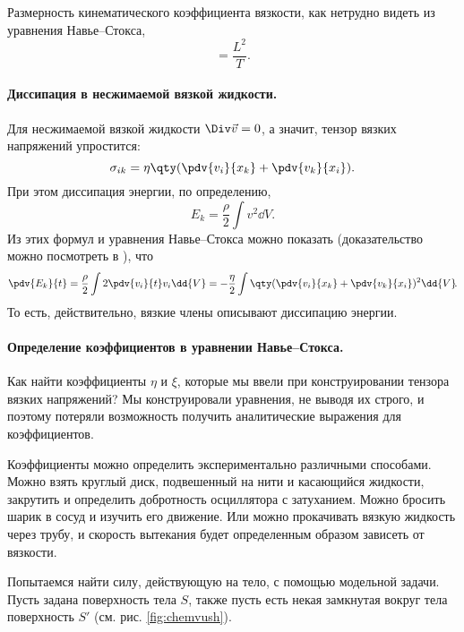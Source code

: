 Размерность кинематического коэффициента вязкости, как нетрудно видеть из уравнения Навье--Стокса,
\begin{equation}
    [\nu] = \frac{L^2}{T}.
\end{equation}

\paragraph{Диссипация в несжимаемой вязкой жидкости.} Для несжимаемой вязкой жидкости $\Div \vec{v}=0$, а значит, тензор вязких напряжений упростится:
\begin{equation}
    \label{eq:sigma_tensor}
	\sigma_{ik} = \eta\qty(\pdv{v_i}{x_k}+\pdv{v_k}{x_i}).
\end{equation}
При этом диссипация энергии, по определению,
\begin{equation}
	E_k = \frac{\rho}{2}\int v^2 \dd{V}\!.
\end{equation}
Из этих формул и уравнения Навье--Стокса можно показать (доказательство можно посмотреть в \cite[стр. 78]{nu1}), что
\begin{equation}
    \pdv{E_k}{t} = \frac{\rho}{2} \int 2\pdv{v_i}{t} v_i \dd{V}=
    -\frac{\eta}{2} \int   \qty(\pdv{v_i}{x_k}+\pdv{v_k}{x_i})^2 \dd{V}\!.
\end{equation}
То есть, действительно, вязкие члены описывают диссипацию энергии.

\paragraph{Определение коэффициентов в уравнении Навье--Стокса.} Как найти коэффициенты $\eta$ и $\xi$, которые мы ввели при конструировании тензора вязких напряжений? Мы конструировали уравнения, не выводя их строго, и поэтому потеряли возможность получить аналитические выражения для коэффициентов.

Коэффициенты можно определить экспериментально различными способами. Можно взять круглый диск, подвешенный на нити и касающийся жидкости, закрутить и определить добротность осциллятора с затуханием. Можно бросить шарик в сосуд и изучить его движение. Или можно прокачивать вязкую жидкость через трубу, и скорость вытекания будет определенным образом зависеть от вязкости.

Попытаемся найти силу, действующую на тело, с помощью модельной задачи. Пусть задана поверхность тела $S$,  также пусть есть некая замкнутая вокруг тела поверхность $S'$ (см. рис. \ref{fig:chemvush}).

